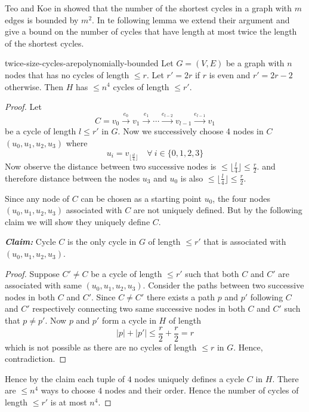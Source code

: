 Teo and Koe in \cite{TeoKoh_1992_Tno_CONF} showed that the number of the shortest cycles in a graph with $m$ edges is bounded by $m^2$. In te following lemma we extend their argument and give a bound on the number of cycles that have length at most twice the length of the shortest cycles.
\begin{lemma}{\cite[Lemma 3.4]{FennerGurjarThierauf_2016_Bpm_CONF}}{twice-size-cycles-arepolynomially-bounded}
	Let $G=(V,E)$ be a graph with $n$ nodes that has no cycles of length $\leq r$. Let $r'=2r$ if $r$ is even and $r'=2r-2$ otherwise. Then $H$ has $\leq n^4$ cycles of length $\leq r'$.
\end{lemma}
\begin{proof}
	Let $$C=v_0\overset{e_0}{\longrightarrow}v_1\overset{e_1}{\longrightarrow}\cdots \overset{e_{l-2}}{\longrightarrow}v_{l-1}\overset{e_{l-1}}{\longrightarrow}v_1$$be a cycle of length $l\leq r'$ in $G$. Now we successively choose 4 nodes in $C$ $(u_0,u_1,u_2,u_3)$ where $$u_i=v_{\lfloor \frac{il}4\rfloor}\quad \forall\ i\in \{0,1,2,3\}$$Now observe the distance between two successive nodes is $\leq \lfloor \frac{l}{4}\rfloor \leq \frac{r}{2}$. and therefore distance between the nodes $u_3$ and $u_0$ is  also $\leq \lfloor \frac{l}4\rfloor\leq \frac{r}{2}$.

	Since any node of $C$ can be chosen as a starting point $u_0$, the four nodes $(u_0,u_1,u_2,u_3)$ associated with $C$ are not uniquely defined. But by the following claim we will show they uniquely define $C$.\parinf\vspace*{2mm}

	\textbf{\textit{Claim:}} Cycle $C$ is the only cycle in $G$ of length $\leq r'$ that is associated with $(u_0,u_1,u_2,u_3)$.\parinn

	\begin{proof}
		Suppose $C'\neq C$ be a cycle of length $\leq r'$ such that both $C$ and $C'$ are associated with same $(u_0, u_1,u_2, u_3)$. Consider the paths between two successive nodes in both $C$ and $C'$. Since $C\neq C'$ there exists a path $p$ and $p'$ following $C$ and $C'$ respectively connecting two same successive nodes in both $C$ and $C'$ such that $p\neq p'$. Now $p$ and $p'$ form a cycle in $H$ of length $$|p|+|p'|\leq\frac{r}{2}+\frac{r}{2}=r$$which is not possible as there are no cycles of length $\leq r$ in $G$. Hence, contradiction.
	\end{proof}
Hence by the claim each tuple of $4$ nodes uniquely defines a cycle $C$ in $H$. There are $\leq n^4$ ways to choose $4$ nodes and their order. Hence the number of cycles of length $\leq r'$ is at most $n^4$.
\end{proof}

